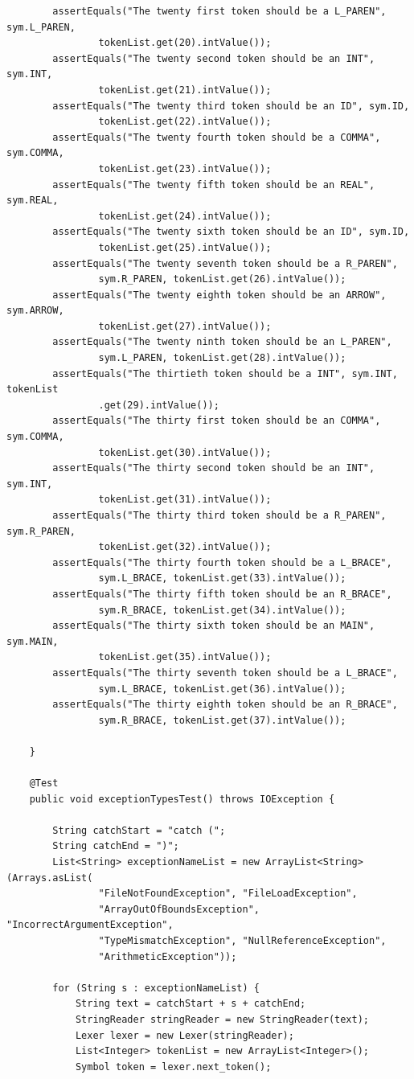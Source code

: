 \documentclass{report}
\begin{document}
\begin{verbatim}
		assertEquals("The twenty first token should be a L_PAREN", sym.L_PAREN,
				tokenList.get(20).intValue());
		assertEquals("The twenty second token should be an INT", sym.INT,
				tokenList.get(21).intValue());
		assertEquals("The twenty third token should be an ID", sym.ID,
				tokenList.get(22).intValue());
		assertEquals("The twenty fourth token should be a COMMA", sym.COMMA,
				tokenList.get(23).intValue());
		assertEquals("The twenty fifth token should be an REAL", sym.REAL,
				tokenList.get(24).intValue());
		assertEquals("The twenty sixth token should be an ID", sym.ID,
				tokenList.get(25).intValue());
		assertEquals("The twenty seventh token should be a R_PAREN",
				sym.R_PAREN, tokenList.get(26).intValue());
		assertEquals("The twenty eighth token should be an ARROW", sym.ARROW,
				tokenList.get(27).intValue());
		assertEquals("The twenty ninth token should be an L_PAREN",
				sym.L_PAREN, tokenList.get(28).intValue());
		assertEquals("The thirtieth token should be a INT", sym.INT, tokenList
				.get(29).intValue());
		assertEquals("The thirty first token should be an COMMA", sym.COMMA,
				tokenList.get(30).intValue());
		assertEquals("The thirty second token should be an INT", sym.INT,
				tokenList.get(31).intValue());
		assertEquals("The thirty third token should be a R_PAREN", sym.R_PAREN,
				tokenList.get(32).intValue());
		assertEquals("The thirty fourth token should be a L_BRACE",
				sym.L_BRACE, tokenList.get(33).intValue());
		assertEquals("The thirty fifth token should be an R_BRACE",
				sym.R_BRACE, tokenList.get(34).intValue());
		assertEquals("The thirty sixth token should be an MAIN", sym.MAIN,
				tokenList.get(35).intValue());
		assertEquals("The thirty seventh token should be a L_BRACE",
				sym.L_BRACE, tokenList.get(36).intValue());
		assertEquals("The thirty eighth token should be an R_BRACE",
				sym.R_BRACE, tokenList.get(37).intValue());

	}

	@Test
	public void exceptionTypesTest() throws IOException {

		String catchStart = "catch (";
		String catchEnd = ")";
		List<String> exceptionNameList = new ArrayList<String>(Arrays.asList(
				"FileNotFoundException", "FileLoadException",
				"ArrayOutOfBoundsException", "IncorrectArgumentException",
				"TypeMismatchException", "NullReferenceException",
				"ArithmeticException"));
		
		for (String s : exceptionNameList) {
			String text = catchStart + s + catchEnd;
			StringReader stringReader = new StringReader(text);
			Lexer lexer = new Lexer(stringReader);
			List<Integer> tokenList = new ArrayList<Integer>();
			Symbol token = lexer.next_token();


\end{verbatim}
\end{document}

